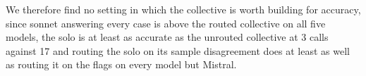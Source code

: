 We therefore find no setting in which the collective is worth building
for accuracy, since sonnet answering every case is above the routed
collective on all five models, the solo is at least as accurate as the
unrouted collective at 3 calls against 17 and routing the solo on its
sample disagreement does at least as well as routing it on the flags on
every model but Mistral.

